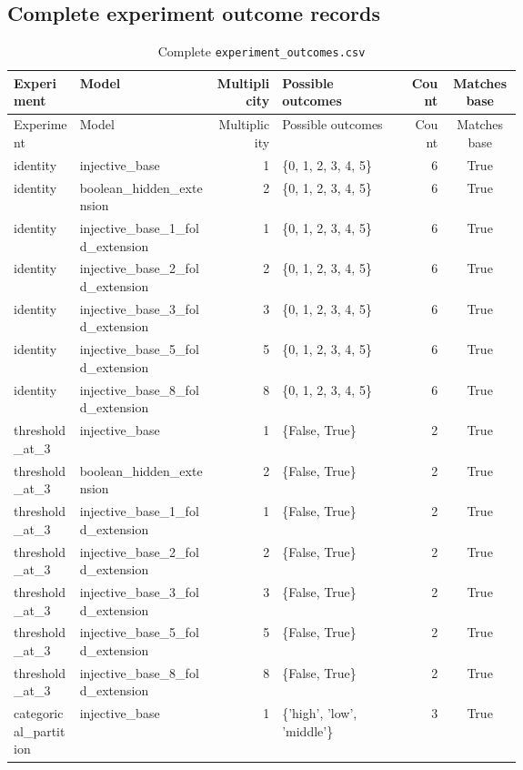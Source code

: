 \begin{landscape}
\subsection{Complete experiment outcome records}
\scriptsize
\begin{longtable}{@{}p{0.13\linewidth}p{0.27\linewidth}rp{0.25\linewidth}rc@{}}
\caption{Complete \texttt{experiment\_outcomes.csv}}\label{tab:fullexperiments}\\
\toprule
Experiment & Model & Multiplicity & Possible outcomes & Count & Matches base \\
\midrule
\endfirsthead
\toprule
Experiment & Model & Multiplicity & Possible outcomes & Count & Matches base \\
\midrule
\endhead
identity & injective\_base & 1 & \{0, 1, 2, 3, 4, 5\} & 6 & True \\
identity & boolean\_hidden\_extension & 2 & \{0, 1, 2, 3, 4, 5\} & 6 & True \\
identity & injective\_base\_1\_fold\_extension & 1 & \{0, 1, 2, 3, 4, 5\} & 6 & True \\
identity & injective\_base\_2\_fold\_extension & 2 & \{0, 1, 2, 3, 4, 5\} & 6 & True \\
identity & injective\_base\_3\_fold\_extension & 3 & \{0, 1, 2, 3, 4, 5\} & 6 & True \\
identity & injective\_base\_5\_fold\_extension & 5 & \{0, 1, 2, 3, 4, 5\} & 6 & True \\
identity & injective\_base\_8\_fold\_extension & 8 & \{0, 1, 2, 3, 4, 5\} & 6 & True \\
threshold\_at\_3 & injective\_base & 1 & \{False, True\} & 2 & True \\
threshold\_at\_3 & boolean\_hidden\_extension & 2 & \{False, True\} & 2 & True \\
threshold\_at\_3 & injective\_base\_1\_fold\_extension & 1 & \{False, True\} & 2 & True \\
threshold\_at\_3 & injective\_base\_2\_fold\_extension & 2 & \{False, True\} & 2 & True \\
threshold\_at\_3 & injective\_base\_3\_fold\_extension & 3 & \{False, True\} & 2 & True \\
threshold\_at\_3 & injective\_base\_5\_fold\_extension & 5 & \{False, True\} & 2 & True \\
threshold\_at\_3 & injective\_base\_8\_fold\_extension & 8 & \{False, True\} & 2 & True \\
categorical\_partition & injective\_base & 1 & \{'high', 'low', 'middle'\} & 3 & True \\

\end{longtable}
\end{landscape}
